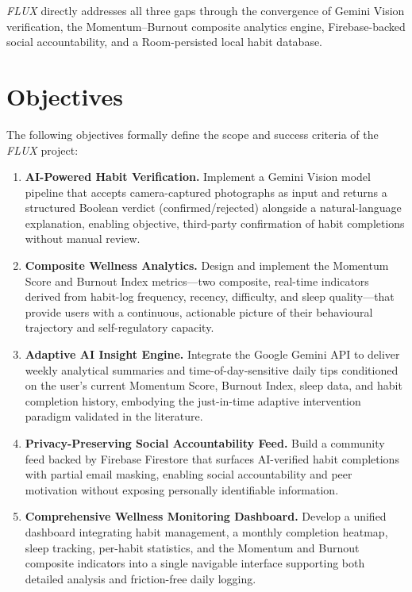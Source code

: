 \documentclass[12pt,a4paper]{article}
\newcommand{\FL}{\textit{FLUX}}
\begin{document}
\FL{} directly addresses all three gaps through the convergence of Gemini Vision
verification, the Momentum--Burnout composite analytics engine, Firebase-backed
social accountability, and a Room-persisted local habit database.

\section{Objectives}

The following objectives formally define the scope and success criteria of the
\FL{} project:

\begin{enumerate}[leftmargin=1.5em, itemsep=6pt]

    \item \textbf{AI-Powered Habit Verification.}
    Implement a Gemini Vision model pipeline that accepts camera-captured photographs
    as input and returns a structured Boolean verdict (confirmed/rejected) alongside
    a natural-language explanation, enabling objective, third-party confirmation of
    habit completions without manual review.

    \item \textbf{Composite Wellness Analytics.}
    Design and implement the Momentum Score and Burnout Index metrics---two composite,
    real-time indicators derived from habit-log frequency, recency, difficulty, and
    sleep quality---that provide users with a continuous, actionable picture of their
    behavioural trajectory and self-regulatory capacity.

    \item \textbf{Adaptive AI Insight Engine.}
    Integrate the Google Gemini API to deliver weekly analytical summaries and
    time-of-day-sensitive daily tips conditioned on the user's current Momentum Score,
    Burnout Index, sleep data, and habit completion history, embodying the
    just-in-time adaptive intervention paradigm validated in the literature.

    \item \textbf{Privacy-Preserving Social Accountability Feed.}
    Build a community feed backed by Firebase Firestore that surfaces AI-verified
    habit completions with partial email masking, enabling social accountability and
    peer motivation without exposing personally identifiable information.

    \item \textbf{Comprehensive Wellness Monitoring Dashboard.}
    Develop a unified dashboard integrating habit management, a monthly completion
    heatmap, sleep tracking, per-habit statistics, and the Momentum and Burnout
    composite indicators into a single navigable interface supporting both detailed
    analysis and friction-free daily logging.


\end{enumerate}
\end{document}

